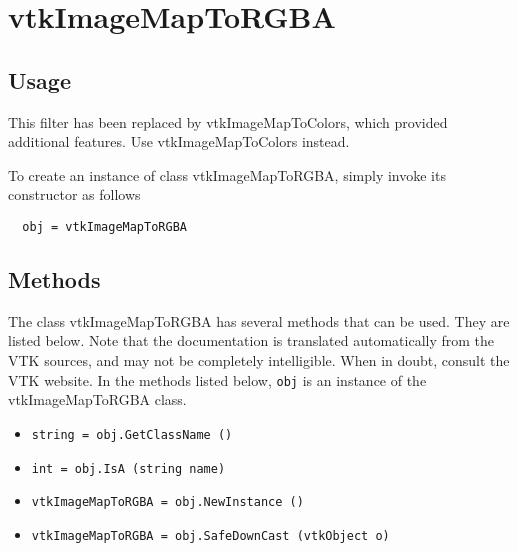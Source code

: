 \section{vtkImageMapToRGBA}

\subsection{Usage}

 This filter has been replaced by vtkImageMapToColors, which provided
 additional features.  Use vtkImageMapToColors instead.

To create an instance of class vtkImageMapToRGBA, simply
invoke its constructor as follows
\begin{verbatim}
  obj = vtkImageMapToRGBA
\end{verbatim}
\subsection{Methods}

The class vtkImageMapToRGBA has several methods that can be used.
  They are listed below.
Note that the documentation is translated automatically from the VTK sources,
and may not be completely intelligible.  When in doubt, consult the VTK website.
In the methods listed below, \verb|obj| is an instance of the vtkImageMapToRGBA class.
\begin{itemize}
\item  \verb|string = obj.GetClassName ()|

\item  \verb|int = obj.IsA (string name)|

\item  \verb|vtkImageMapToRGBA = obj.NewInstance ()|

\item  \verb|vtkImageMapToRGBA = obj.SafeDownCast (vtkObject o)|

\end{itemize}

